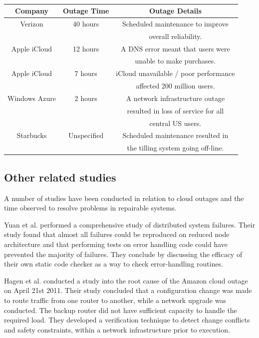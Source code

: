 \begin {table}[]
\caption {}
\begin{flushleft}
\begin{tabular}{c | c |  c} Company & Outage Time & Outage Details 
\\ \hline Verizon	& 40 hours & Scheduled maintenance to  improve 
\\ & & overall reliability.
\\ Apple iCloud & 12 hours & A DNS error meant that users were 
\\ & & unable to make  purchases.
\\ Apple iCloud	& 7 hours & iCloud unavailable / poor performance 
\\ & & affected 200 million  users.
\\  Windows Azure & 2 hours & A network infrastructure outage  
\\ & & resulted in loss of service for all 
\\ & & central US users.
\\  Starbucks & Unspecified &  Scheduled maintenance resulted in 
\\ & & the tilling system going off-line.  \end{tabular}
\end{flushleft}
\end{table}



\subsection{Other related studies}
A number of studies have been conducted in relation to cloud outages and the time observed to resolve problems in repairable systems. \par

Yuan et al. \cite{yuan2014simple} performed a comprehensive study of distributed system failures. Their study found that almost all failures could be reproduced on reduced node architecture and that performing tests on error handling code could have prevented the majority of failures. They conclude by discussing the efficacy of their own static code checker as a way to check error-handling routines. \par

Hagen et al. \cite{hagen2012efficient} conducted a study into the root cause of the Amazon cloud outage on April 21st 2011. Their study concluded that a configuration change was made to route traffic from one router to another, while a network upgrade was conducted. The backup router did not have sufficient capacity to handle the required load. They developed a verification technique to detect change conflicts and safety constraints, within a network infrastructure prior to execution. \par

